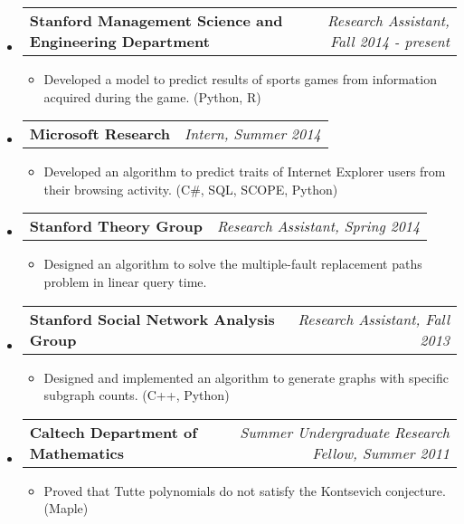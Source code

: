\documentclass[letterpaper,10pt]{article}
\makeatletter
\newcommand{\resitem}[1]{\item #1 \vspace{-2pt}}
\newcommand{\ressubheading}[4]{
\begin{tabular*}{7.0in}{l@{\extracolsep{\fill}}r}
		\textbf{#1} & \textit{#4} \\
\end{tabular*}\vspace{-6pt}}
\makeatother
\begin{document}
\begin{itemize}
\item
	\ressubheading{Stanford Management Science and Engineering Department}{Stanford, CA}{Research Assistant}{Research Assistant, Fall 2014 - present}
	\begin{itemize}
		\resitem{Developed a model to predict results of sports games from information acquired during the game. (Python, R)}
	\end{itemize}
\item
	\ressubheading{Microsoft Research}{Mountain View, CA}{Intern}{Intern, Summer 2014}
	\begin{itemize}
		\resitem{Developed an algorithm to predict traits of Internet Explorer users from their browsing activity. (C\#, SQL, SCOPE, Python)}
	\end{itemize}
\item
	\ressubheading{Stanford Theory Group}{Stanford, CA}{Research Assistant}{Research Assistant, Spring 2014}
	\begin{itemize}
		\resitem{Designed an algorithm to solve the multiple-fault replacement paths problem in linear query time.}
	\end{itemize}
\item
	\ressubheading{Stanford Social Network Analysis Group}{Stanford, CA}{Research Assistant}{Research Assistant, Fall 2013}
	\begin{itemize}
		\resitem{Designed and implemented an algorithm to generate graphs with specific subgraph counts.  (C++, Python)}
	\end{itemize}


\item
	\ressubheading{Caltech Department of Mathematics}{Pasadena, CA}{Summer Undergraduate Research Fellow}{Summer Undergraduate Research Fellow, Summer 2011}
	\begin{itemize}
		\resitem{Proved that Tutte polynomials do not satisfy the Kontsevich conjecture.  (Maple)}
	\end{itemize}


\end{itemize}
\end{document}
